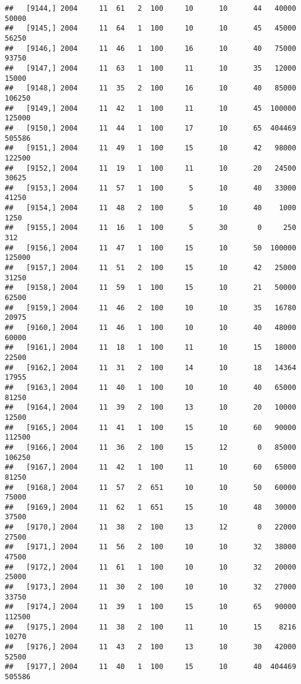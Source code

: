 \documentclass{article}\usepackage[]{graphicx}\usepackage[]{color}
\makeatletter
\newenvironment{kframe}{%
 \def\at@end@of@kframe{}%
 \ifinner\ifhmode%
  \def\at@end@of@kframe{\end{minipage}}%
  \begin{minipage}{\columnwidth}%
 \fi\fi%
 \def\FrameCommand##1{\hskip\@totalleftmargin \hskip-\fboxsep
 \colorbox{shadecolor}{##1}\hskip-\fboxsep
     \hskip-\linewidth \hskip-\@totalleftmargin \hskip\columnwidth}%
 \MakeFramed {\advance\hsize-\width
   \@totalleftmargin\z@ \linewidth\hsize
   \@setminipage}}%
 {\par\unskip\endMakeFramed%
 \at@end@of@kframe}
\newenvironment{knitrout}{}{} %
\makeatother
\begin{document}
\begin{knitrout}
\begin{kframe}
\begin{verbatim}
##   [9144,] 2004     11  61   2  100     10      10      44   40000   50000
##   [9145,] 2004     11  64   1  100     10      10      45   45000   56250
##   [9146,] 2004     11  46   1  100     16      10      40   75000   93750
##   [9147,] 2004     11  63   1  100     11      10      35   12000   15000
##   [9148,] 2004     11  35   2  100     16      10      40   85000  106250
##   [9149,] 2004     11  42   1  100     11      10      45  100000  125000
##   [9150,] 2004     11  44   1  100     17      10      65  404469  505586
##   [9151,] 2004     11  49   1  100     15      10      42   98000  122500
##   [9152,] 2004     11  19   1  100     11      10      20   24500   30625
##   [9153,] 2004     11  57   1  100      5      10      40   33000   41250
##   [9154,] 2004     11  48   2  100      5      10      40    1000    1250
##   [9155,] 2004     11  16   1  100      5      30       0     250     312
##   [9156,] 2004     11  47   1  100     15      10      50  100000  125000
##   [9157,] 2004     11  51   2  100     15      10      42   25000   31250
##   [9158,] 2004     11  59   1  100     15      10      21   50000   62500
##   [9159,] 2004     11  46   2  100     10      10      35   16780   20975
##   [9160,] 2004     11  46   1  100     10      10      40   48000   60000
##   [9161,] 2004     11  18   1  100     11      10      15   18000   22500
##   [9162,] 2004     11  31   2  100     14      10      18   14364   17955
##   [9163,] 2004     11  40   1  100     10      10      40   65000   81250
##   [9164,] 2004     11  39   2  100     13      10      20   10000   12500
##   [9165,] 2004     11  41   1  100     15      10      60   90000  112500
##   [9166,] 2004     11  36   2  100     15      12       0   85000  106250
##   [9167,] 2004     11  42   1  100     11      10      60   65000   81250
##   [9168,] 2004     11  57   2  651     10      10      50   60000   75000
##   [9169,] 2004     11  62   1  651     15      10      48   30000   37500
##   [9170,] 2004     11  38   2  100     13      12       0   22000   27500
##   [9171,] 2004     11  56   2  100     10      10      32   38000   47500
##   [9172,] 2004     11  61   1  100     10      10      32   20000   25000
##   [9173,] 2004     11  30   2  100     10      10      32   27000   33750
##   [9174,] 2004     11  39   1  100     15      10      65   90000  112500
##   [9175,] 2004     11  38   2  100     11      10      15    8216   10270
##   [9176,] 2004     11  43   2  100     13      10      30   42000   52500
##   [9177,] 2004     11  40   1  100     15      10      40  404469  505586

\end{verbatim}
\end{kframe}
\end{knitrout}
\end{document}
